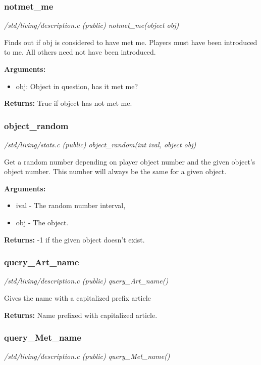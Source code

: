 \subsubsection{notmet\_me}

{\em /std/living/description.c (public) notmet\_me(object obj)}

Finds out if obj is considered to have met me. Players must
have been introduced to me. All others need not have been
introduced.

{\bf Arguments:}
\begin{itemize}
\item      obj: Object in question, has it met me?
\end{itemize}

{\bf Returns:}        True if object has not met me.


\subsubsection{object\_random}

{\em /std/living/stats.c (public) object\_random(int ival, object obj)}

Get a random number depending on player object number
and the given object's object number. This number will
always be the same for a given object.

{\bf Arguments:}
\begin{itemize}
\item     ival - The random number interval,
\item obj - The object.
\end{itemize}

{\bf Returns:}    -1 if the given object doesn't exist.


\subsubsection{query\_Art\_name}

{\em /std/living/description.c (public) query\_Art\_name()}

Gives the name with a capitalized prefix article

{\bf Returns:}      Name prefixed with capitalized article.


\subsubsection{query\_Met\_name}

{\em /std/living/description.c (public) query\_Met\_name()}



